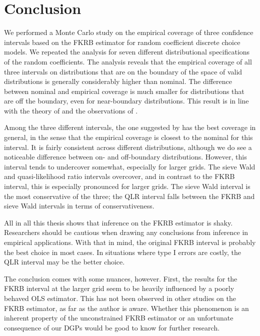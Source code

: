 \section{Conclusion}
\label{sec:conclusion}
We performed a Monte Carlo study on the empirical coverage of three confidence intervals based on the FKRB estimator for random coefficient discrete choice models.
We repeated the analysis for seven different distributional specifications of the random coefficients.
The analysis reveals that the empirical coverage of all three intervals on distributions that are on the boundary of the space of valid distributions is generally considerably higher than nominal.
The difference between nominal and empirical coverage is much smaller for distributions that are off the boundary, even for near-boundary distributions.
This result is in line with the theory of \citet{Andrews1999} and the observations of \citet{FoxKimRyanBajari2011}.

Among the three different intervals, the one suggested by \citet{FoxKimRyanBajari2011} has the best coverage in general, in the sense that the empirical coverage is closest to the nominal for this interval.
It is fairly consistent across different distributions, although we do see a noticeable difference between on- and off-boundary distributions.
However, this interval tends to undercover somewhat, especially for larger grids.
The sieve Wald and quasi-likelihood ratio intervals overcover, and in contrast to the FKRB interval, this is especially pronounced for larger grids.
The sieve Wald interval is the most conservative of the three; the QLR interval falls between the FKRB and sieve Wald intervals in terms of conservativeness.

All in all this thesis shows that inference on the FKRB estimator is shaky.
Researchers should be cautious when drawing any conclusions from inference in empirical applications.
With that in mind, the original FKRB interval is probably the best choice in most cases.
In situations where type I errors are costly, the QLR interval may be the better choice.

The conclusion comes with some nuances, however.
First, the results for the FKRB interval at the larger grid seem to be heavily influenced by a poorly behaved OLS estimator.
This has not been observed in other studies on the FKRB estimator, as far as the author is aware.
Whether this phenomenon is an inherent property of the unconstrained FKRB estimator or an unfortunate consequence of our DGPs would be good to know for further research.

